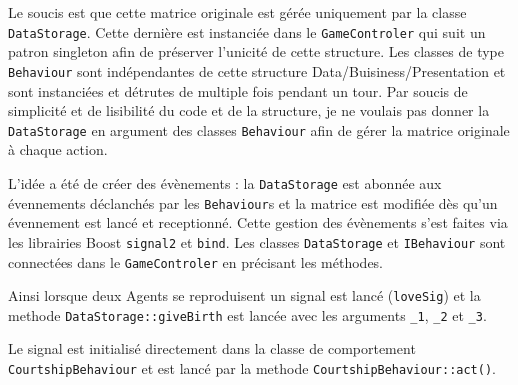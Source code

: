 Le soucis est que cette matrice originale est gérée uniquement par la classe \verb$DataStorage$. Cette dernière est instanciée dans le \verb$GameControler$ qui suit un patron singleton afin de préserver l'unicité de cette structure. Les classes de type \verb$Behaviour$ sont indépendantes de cette structure Data/Buisiness/Presentation et sont instanciées et détrutes de multiple fois pendant un tour. Par soucis de simplicité et de lisibilité du code et de la structure, je ne voulais pas donner la \verb$DataStorage$ en argument des classes \verb$Behaviour$ afin de gérer la matrice originale à chaque action.

L'idée a été de créer des évènements : la \verb$DataStorage$ est abonnée aux évennements déclanchés par les \verb$Behaviour$s et la matrice est modifiée dès qu'un évennement est lancé et receptionné. Cette gestion des évènements s'est faites via les librairies Boost \verb$signal2$ et \verb$bind$. Les classes \verb$DataStorage$ et \verb$IBehaviour$ sont connectées dans le \verb$GameControler$ en précisant les méthodes.



Ainsi lorsque deux Agents se reproduisent un signal est lancé (\verb$loveSig$) et la methode \verb$DataStorage::giveBirth$ est lancée avec les arguments \verb$_1$, \verb$_2$ et \verb$_3$.

Le signal est initialisé directement dans la classe de comportement \verb$CourtshipBehaviour$ et est lancé par la methode \verb$CourtshipBehaviour::act()$.



